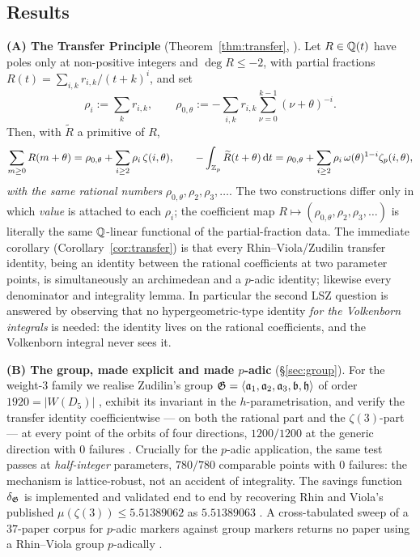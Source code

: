 \subsection{Results}\label{ss:results}

\smallskip\noindent\textbf{(A) The Transfer Principle} (Theorem~\ref{thm:transfer},
\PROVED). Let $R\in\mathbb{Q}(t)$ have poles only at non-positive integers and $\deg R\le-2$, with
partial fractions $R(t)=\sum_{i,k}r_{i,k}/(t+k)^i$, and set
\[
 \rho_i:=\sum_k r_{i,k},\qquad
 \rho_{0,\theta}:=-\sum_{i,k}r_{i,k}\sum_{\nu=0}^{k-1}(\nu+\theta)^{-i}.
\]
Then, with $\widetilde R$ a primitive of $R$,
\[
 \sum_{m\ge0}R(m+\theta)=\rho_{0,\theta}+\sum_{i\ge2}\rho_i\,\zeta(i,\theta),
 \qquad
 -\int_{\mathbb{Z}_p}\widetilde R(t+\theta)\,\mathrm{d} t
   =\rho_{0,\theta}+\sum_{i\ge2}\rho_i\,\omega(\theta)^{1-i}\zeta_p(i,\theta),
\]
\emph{with the same rational numbers} $\rho_{0,\theta},\rho_2,\rho_3,\dots$. The two
constructions differ only in which \emph{value} is attached to each $\rho_i$; the
coefficient map $R\mapsto(\rho_{0,\theta},\rho_2,\rho_3,\dots)$ is literally the same
$\mathbb{Q}$-linear functional of the partial-fraction data. The immediate corollary
(Corollary~\ref{cor:transfer}) is that every Rhin--Viola/Zudilin transfer identity, being an
identity between the rational coefficients at two parameter points, is simultaneously an
archimedean and a $p$-adic identity; likewise every denominator and integrality lemma. In
particular the second LSZ question is answered by observing that no hypergeometric-type
identity \emph{for the Volkenborn integrals} is needed: the identity lives on the rational
coefficients, and the Volkenborn integral never sees it.

\smallskip\noindent\textbf{(B) The group, made explicit and made $p$-adic}
(\S\ref{sec:group}). For the weight-$3$ family we realise Zudilin's group
$\mathfrak{G}=\langle\mathfrak a_1,\mathfrak a_2,\mathfrak a_3,\mathfrak b,\mathfrak h\rangle$ of
order $1920=|W(D_5)|$ , exhibit its invariant in the
$h$-parametrisation, and verify the transfer identity coefficientwise --- on both the
rational part and the $\zeta(3)$-part --- at every point of the orbits of four directions,
$1200/1200$ at the generic direction with $0$ failures . Crucially for the $p$-adic application, the same test passes at
\emph{half-integer} parameters, $780/780$ comparable points with $0$ failures: the mechanism
is lattice-robust, not an accident of integrality. The savings function $\delta_{\mathfrak{G}}$ is
implemented and validated end to end by recovering Rhin and Viola's published
$\mu(\zeta(3))\le5.51389062$ as $5.51389063$ . A cross-tabulated sweep of a
$37$-paper corpus for $p$-adic markers against group markers returns no paper using a
Rhin--Viola group $p$-adically .

